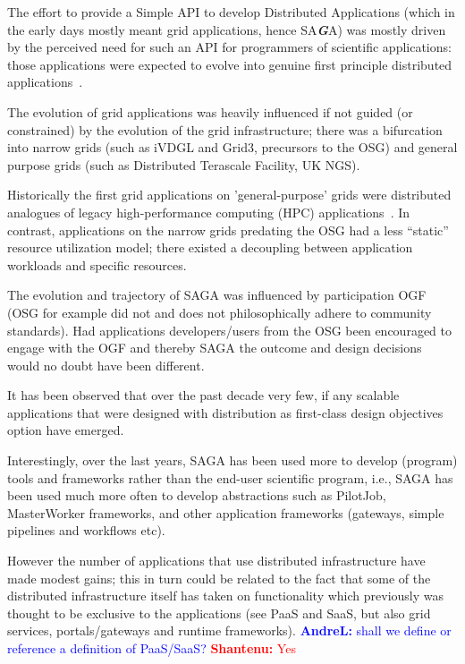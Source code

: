\documentclass{article}
\newcommand{\B}[1]{\textbf{#1}}
\newcommand{\BI}[1]{\textbf{\textit{#1}}}
\newcommand{\jhanote}[1]{{\textcolor{red}{     \B{Shantenu:} #1 }}}
\newcommand{\alnote}[1]{{\textcolor{blue}{    \B{AndreL:  } #1 }}}
\newcommand{\jhanote}[1]{}
\newcommand{\alnote}[1]{}
\begin{document}
  The effort to provide a Simple API to develop Distributed Applications (which
  in the early days mostly meant grid applications, hence SA\BI{G}A) was mostly
  driven by the perceived need for such an API for programmers of scientific
  applications: those applications were expected to evolve into genuine first
  principle distributed applications~\cite{gat}.

  The evolution of grid applications was heavily influenced if not guided (or
  constrained) by the evolution of the grid infrastructure; there was
  a bifurcation into narrow grids (such as iVDGL and Grid3, precursors to the
  OSG) and general purpose grids (such as Distributed Terascale Facility, UK
  NGS).

  Historically the first grid applications on 'general-purpose' grids were
  distributed analogues of legacy high-performance computing (HPC)
  applications~\cite{dpagrid2009}. In contrast, applications on the narrow grids
  predating the OSG had a less ``static'' resource utilization model; there
  existed a decoupling between application workloads and specific resources.

  The evolution and trajectory of SAGA was influenced by participation OGF (OSG
  for example did not and does not philosophically adhere to community
  standards). Had applications developers/users from the OSG been encouraged to
  engage with the OGF and thereby SAGA the outcome and design decisions would no
  doubt have been different.

  It has been observed that over the past decade very few, if any scalable
  applications that were designed with distribution as first-class design
  objectives option have emerged.

  Interestingly, over the last years, SAGA has been used more to develop
  (program) tools and frameworks rather than the end-user scientific program,
  i.e., SAGA has been used much more often to develop abstractions such as
  PilotJob, MasterWorker frameworks, and other application frameworks (gateways,
  simple pipelines and workflows etc).

  However the number of applications that use distributed infrastructure have
  made modest gains; this in turn could be related to the fact that some of the
  distributed infrastructure itself has taken on functionality which previously
  was thought to be exclusive to the applications (see PaaS and SaaS, but also
  grid services, portals/gateways and runtime frameworks). \alnote{shall we
  define or reference a definition of PaaS/SaaS?}\jhanote{Yes}
\end{document}
